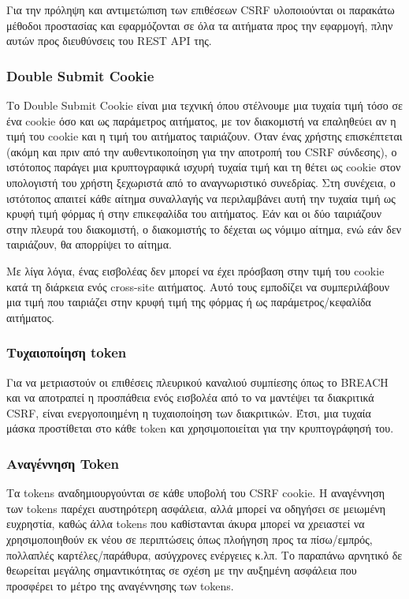 Για την πρόληψη και αντιμετώπιση των επιθέσεων CSRF υλοποιούνται οι παρακάτω μέθοδοι προστασίας και εφαρμόζονται σε όλα τα αιτήματα προς την εφαρμογή, πλην αυτών προς διευθύνσεις του REST API της.

\subsubsection{Double Submit Cookie}
Το Double Submit Cookie είναι μια τεχνική όπου στέλνουμε μια τυχαία τιμή τόσο σε ένα cookie όσο και ως παράμετρος αιτήματος, με τον διακομιστή να επαληθεύει αν η τιμή του cookie και η τιμή του αιτήματος ταιριάζουν. Όταν ένας χρήστης επισκέπτεται (ακόμη και πριν από την αυθεντικοποίηση για την αποτροπή του CSRF σύνδεσης), ο ιστότοπος παράγει μια κρυπτογραφικά ισχυρή τυχαία τιμή και τη θέτει ως cookie στον υπολογιστή του χρήστη ξεχωριστά από το αναγνωριστικό συνεδρίας. Στη συνέχεια, ο ιστότοπος απαιτεί κάθε αίτημα συναλλαγής να περιλαμβάνει αυτή την τυχαία τιμή ως κρυφή τιμή φόρμας ή στην επικεφαλίδα του αιτήματος. Εάν και οι δύο ταιριάζουν στην πλευρά του διακομιστή, ο διακομιστής το δέχεται ως νόμιμο αίτημα, ενώ εάν δεν ταιριάζουν, θα απορρίψει το αίτημα.

Με λίγα λόγια, ένας εισβολέας δεν μπορεί να έχει πρόσβαση στην τιμή του cookie κατά τη διάρκεια ενός cross-site αιτήματος. Αυτό τους εμποδίζει να συμπεριλάβουν μια τιμή που ταιριάζει στην κρυφή τιμή της φόρμας ή ως παράμετρος/κεφαλίδα αιτήματος.

\subsubsection{Τυχαιοποίηση token}
Για να μετριαστούν οι επιθέσεις πλευρικού καναλιού συμπίεσης όπως το BREACH και να αποτραπεί η προσπάθεια ενός εισβολέα από το να μαντέψει τα διακριτικά CSRF, είναι ενεργοποιημένη η τυχαιοποίηση των διακριτικών. Έτσι, μια τυχαία μάσκα προστίθεται στο κάθε token και χρησιμοποιείται για την κρυπτογράφησή του.

\subsubsection{Αναγέννηση Token}
Τα tokens αναδημιουργούνται σε κάθε υποβολή του CSRF cookie. Η αναγέννηση των tokens παρέχει αυστηρότερη ασφάλεια, αλλά μπορεί να οδηγήσει σε μειωμένη ευχρηστία, καθώς άλλα tokens που καθίστανται άκυρα μπορεί να χρειαστεί να χρησιμοποιηθούν εκ νέου σε περιπτώσεις όπως πλοήγηση προς τα πίσω/εμπρός, πολλαπλές καρτέλες/παράθυρα, ασύγχρονες ενέργειες κ.λπ. Το παραπάνω αρνητικό δε θεωρείται μεγάλης σημαντικότητας σε σχέση με την αυξημένη ασφάλεια που προσφέρει το μέτρο της αναγέννησης των tokens.

